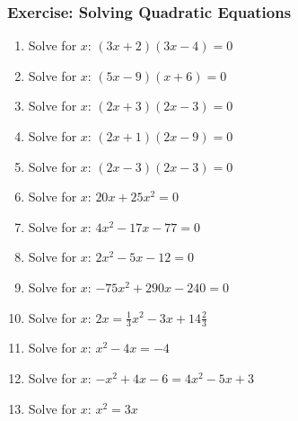     \noindent
\label{m39247*secfhsst!!!underscore!!!id2946}
            \subsubsection{Exercise:  Solving Quadratic Equations }
            \nopagebreak
        \label{m39247*id153332}\begin{enumerate}[noitemsep, label=\textbf{\arabic*}. ] 
            \label{m39247*uid44}\item Solve for $x$: $\left(3x+2\right)\left(3x-4\right)=0$\hspace{1ex}        
\label{m39247*uid45}\item Solve for $x$: $\left(5x-9\right)\left(x+6\right)=0$\hspace{1ex}        
\label{m39247*uid46}\item Solve for $x$: $\left(2x+3\right)\left(2x-3\right)=0$\hspace{1ex}        
\label{m39247*uid47}\item Solve for $x$: $\left(2x+1\right)\left(2x-9\right)=0$\hspace{1ex}        
\label{m39247*uid48}\item Solve for $x$: $\left(2x-3\right)\left(2x-3\right)=0$\hspace{1ex}        
\label{m39247*uid49}\item Solve for $x$: $20x+25{x}^{2}=0$\hspace{1ex}        
\label{m39247*uid50}\item Solve for $x$: $4{x}^{2}-17x-77=0$\hspace{1ex}        
\label{m39247*uid51}\item Solve for $x$: $2{x}^{2}-5x-12=0$  \hspace{1ex}        
\label{m39247*uid52}\item Solve for $x$: $-75{x}^{2}+290x-240=0$\hspace{1ex}        
\label{m39247*uid53}\item Solve for $x$: $2x=\frac{1}{3}{x}^{2}-3x+14\frac{2}{3}$\hspace{1ex}        
\label{m39247*uid54}\item Solve for $x$: ${x}^{2}-4x=-4$\hspace{1ex}        
\label{m39247*uid55}\item Solve for $x$: $-{x}^{2}+4x-6=4{x}^{2}-5x+3$\hspace{1ex}        
\label{m39247*uid56}\item Solve for $x$: ${x}^{2}=3x$\hspace{1ex}        

\end{enumerate}

